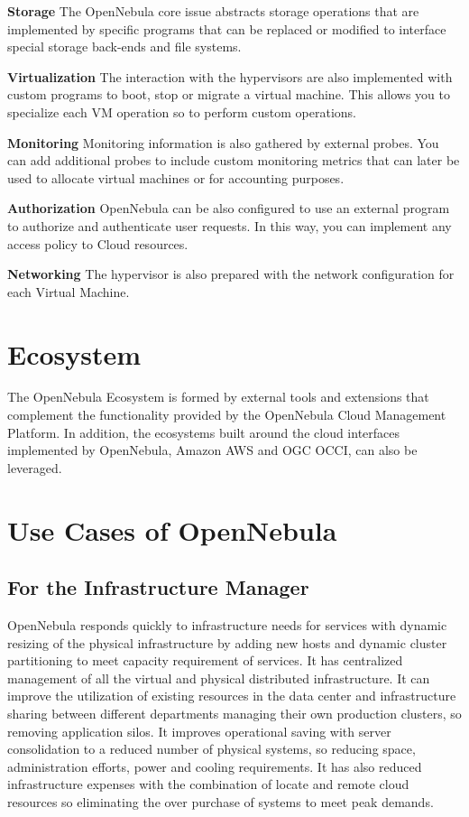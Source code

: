 \documentclass[9pt,twocolumn,twoside]{../../styles/osajnl}
\begin{document}
\textbf{Storage} The OpenNebula core issue abstracts storage 
operations that are implemented by specific programs that can be 
replaced or modified to interface special storage back-ends and file 
systems.

\textbf{Virtualization} The interaction with the hypervisors are also 
implemented with custom programs to boot, stop or migrate a virtual 
machine. This allows you to specialize each VM operation so to 
perform custom operations.

\textbf{Monitoring} Monitoring information is also gathered by 
external probes. You can add additional probes to include custom 
monitoring metrics that can later be used to allocate virtual 
machines or for accounting purposes.

\textbf{Authorization} OpenNebula can be also configured to use an 
external program to authorize and authenticate user requests. In this 
way, you can implement any access policy to Cloud resources.

\textbf{Networking} The hypervisor is also prepared with the network 
configuration for each Virtual Machine.

\section{Ecosystem}

The {OpenNebula Ecosystem}\cite{www-opennebula-ecosystem} is formed 
by external tools and extensions 
that complement the functionality provided by the OpenNebula Cloud 
Management Platform. In addition, the ecosystems built around the 
cloud interfaces implemented by OpenNebula, Amazon AWS and OGC OCCI, 
can also be leveraged. 

\section{Use Cases of OpenNebula}

\subsection{For the Infrastructure Manager}

OpenNebula responds quickly to infrastructure needs for services with 
dynamic resizing of the physical infrastructure by adding new hosts 
and dynamic cluster partitioning to meet capacity requirement of 
services. It has centralized management of all the virtual and 
physical distributed infrastructure. It can improve the utilization 
of existing resources in the data center and infrastructure sharing 
between different departments managing their own production clusters, 
so removing application silos. It improves operational saving with 
server consolidation to a reduced number of physical systems, so 
reducing space, administration efforts, power and cooling 
requirements. It has also reduced infrastructure expenses with the 
combination of locate and remote cloud resources so eliminating the 
over purchase of systems to meet peak demands.
\end{document}
